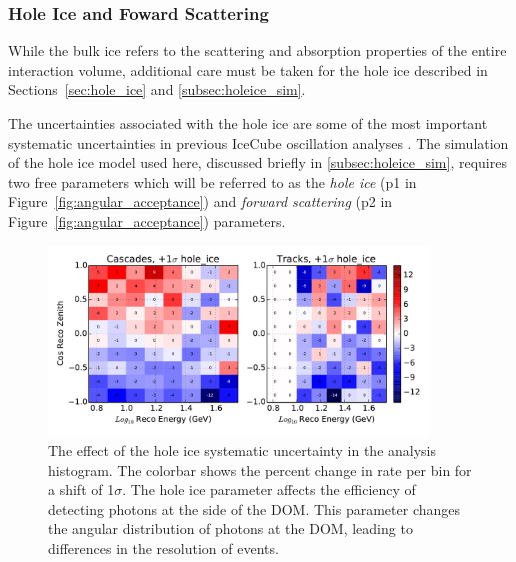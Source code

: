 \subsubsection{Hole Ice and Foward Scattering}
\label{subsubsec:holeice}
While the bulk ice refers to the scattering and absorption properties of the entire interaction volume, additional care must be taken for the hole ice described in Sections~\ref{sec:hole_ice} and \ref{subsec:holeice_sim}.

The uncertainties associated with the hole ice are some of the most important systematic uncertainties in previous IceCube oscillation analyses \cite{IceCube-Oscillation2018}.
The simulation of the hole ice model used here, discussed briefly in \ref{subsec:holeice_sim}, requires two free parameters which will be referred to as the \emph{hole ice} (p1 in Figure~\ref{fig:angular_acceptance}) and \emph{forward scattering} (p2 in Figure~\ref{fig:angular_acceptance}) parameters.

\begin{figure}
\centering
\includegraphics[width=0.9\textwidth]{systematics/hole_ice_variation.pdf} 
\caption[Effect of the hole ice parameter in the analysis histogram]{The effect of the hole ice systematic uncertainty in the analysis histogram. The colorbar shows the percent change in rate per bin for a shift of 1$\sigma$. The hole ice parameter affects the efficiency of detecting photons at the side of the DOM. This parameter changes the angular distribution of photons at the DOM, leading to differences in the resolution of events.}
\label{fig:systematics_holeice}
\end{figure}

